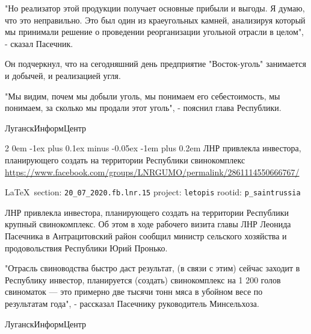 \documentclass[a4paper,11pt]{extreport}
\makeatletter
\renewcommand\subsection{%
  \clearpage
    \@startsection{subsection}%
    {2}%
    {0em}%
    {-1ex plus 0.1ex minus -0.05ex}%
    {-1em plus 0.2em}%
    {\scshape\bfseries\Large}%
}
\makeatother
\begin{document}
"Но реализатор этой продукции получает основные прибыли и выгоды. Я думаю, что
это неправильно. Это был один из краеугольных камней, анализируя который мы
принимали решение о проведении реорганизации угольной отрасли в целом", -
сказал Пасечник.

Он подчеркнул, что на сегодняшний день предприятие "Восток-уголь" занимается и
добычей, и реализацией угля.

"Мы видим, почем мы добыли уголь, мы понимаем его себестоимость, мы понимаем,
за сколько мы продали этот уголь", - пояснил глава Республики.

ЛуганскИнформЦентр
 
 
\subsection{ЛНР привлекла инвестора, планирующего создать на территории Республики свинокомплекс}
\label{sec:20_07_2020.fb.lnr.15}
\url{https://www.facebook.com/groups/LNRGUMO/permalink/2861114550666767/}
  
\vspace{0.5cm}
{\small\LaTeX~section: \verb|20_07_2020.fb.lnr.15| project: \verb|letopis| rootid: \verb|p_saintrussia|}
\vspace{0.5cm}
  
ЛНР привлекла инвестора, планирующего создать на территории Республики крупный
свинокомплекс. Об этом в ходе рабочего визита главы ЛНР Леонида Пасечника в
Антрацитовский район сообщил министр сельского хозяйства и продовольствия
Республики Юрий Пронько.

"Отрасль свиноводства быстро даст результат, (в связи с этим) сейчас заходит в
Республику инвестор, планируется (создать) свинокомплекс на 1 200 голов
свиноматок --- это примерно две тысячи тонн мяса в убойном весе по результатам
года", - рассказал Пасечнику руководитель Минсельхоза.

ЛуганскИнформЦентр
 
 
\end{document}
